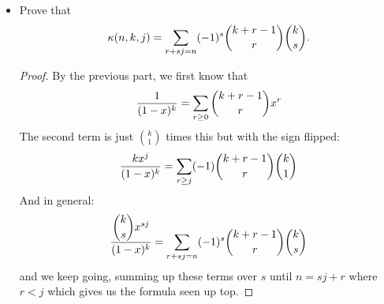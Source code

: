 \documentclass{article}
\begin{document}
\begin{itemize}
        \item Prove that
            \begin{equation*}
                \kappa(n, k, j) = \sum_{r + sj = n}(-1)^{s}\dbinom{k + r - 1}{r} \dbinom{k}{s}.
            \end{equation*}
                \begin{proof}
                    By the previous part, we first know that 
                        \begin{equation*}
                            \dfrac{1}{(1 - x)^{k}} = \sum_{r \geq 0}\dbinom{k + r - 1}{r}x^{r}
                        \end{equation*}
                    The second term is just $\binom{k}{1}$ times this but with the sign flipped:
                        \begin{equation*}
                            \dfrac{kx^{j}}{(1 - x)^{k}} = \sum_{r \geq j} (-1)\dbinom{k + r - 1}{r }\dbinom{k}{1}
                        \end{equation*}
                    And in general:
                        \begin{equation*}
                            \dfrac{\dbinom{k}{s}x^{sj}}{(1 - x)^{k}} = \sum_{r + sj = n}(-1)^{s}\dbinom{k + r - 1}{r}\dbinom{k}{s}
                        \end{equation*}
                    and we keep going, summing up these terms over $s$ until $n = sj + r$ where $r < j$ which gives us the formula seen up top.
                \end{proof}
    \end{itemize}
\end{document}

